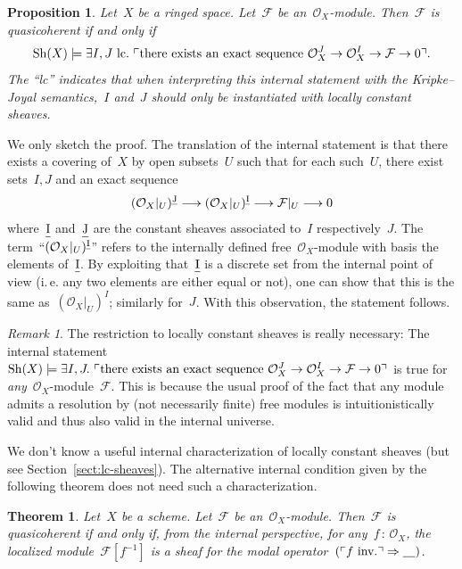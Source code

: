 \documentclass[10pt,reqno,a4paper]{amsbook}
\makeatletter
\theoremstyle{definition}
\theoremstyle{plain}
\newtheorem{prop}[defn]{Proposition}
\newtheorem{thm}[defn]{Theorem}
\theoremstyle{remark}
\newtheorem{rem}[defn]{Remark}
\newcommand{\F}{\mathcal{F}}
\renewcommand{\O}{\mathcal{O}}
\newcommand{\placeholder}{\underline{\quad}}
\let\oldul\ul
\renewcommand{\ul}[1]{\text{\oldul{$#1$}}}
\newcommand{\Sh}{\mathrm{Sh}}
\newcommand{\?}{\,{:}\,}
\renewcommand{\_}{\mathpunct{.}\,}
\newcommand{\speak}[1]{\ulcorner\text{\textnormal{#1}}\urcorner}
\newcommand{\ie}{i.\,e.\@\xspace}
\newcommand{\inv}{inv.\@}
\renewenvironment{proof}[1][\proofname]{\par
  \pushQED{\qed}%
  \normalfont \topsep6\p@\@plus6\p@\relax
  \trivlist
  \item[\hskip\labelsep
        \itshape
    #1\@addpunct{.}]\ignorespaces
}{%
  \popQED\endtrivlist\@endpefalse
}
\makeatother
\begin{document}
\begin{prop}Let~$X$ be a ringed space. Let~$\F$ be an~$\O_X$-module. Then~$\F$
is quasicoherent if and only if
\[ \Sh(X) \models \exists I,J\ \mathrm{lc}\_ \speak{there exists an
  exact sequence~$\O_X^J \to \O_X^I \to \F \to 0$}. \]
The ``\textnormal{lc}'' indicates that when interpreting this internal statement with the
Kripke--Joyal semantics,~$I$ and~$J$ should only be instantiated with
\emph{locally constant} sheaves.
\end{prop}
\begin{proof} We only sketch the proof.
The translation of the internal statement is that there exists a covering
of~$X$ by open subsets~$U$ such that for each such~$U$, there exist sets~$I,J$
and an exact sequence
\[ (\O_X|_U)^{\ul{J}} \longrightarrow (\O_X|_U)^{\ul{I}} \longrightarrow \F|_U
\longrightarrow 0 \]
where~$\ul{I}$ and~$\ul{J}$ are the constant sheaves associated to~$I$
respectively~$J$. The term~``$(\O_X|_U)^{\ul{I}}$'' refers to the internally
defined free~$\O_X$-module with basis the elements of~$\ul{I}$. By exploiting
that~$\ul{I}$ is a discrete set from the internal point of view (\ie any two
elements are either equal or not), one can show that this is the same
as~$(\O_X|_U)^I$; similarly for~$J$. With this observation, the statement
follows.
\end{proof}

\begin{rem}The restriction to locally constant sheaves is really necessary: The
internal statement~$\Sh(X) \models \exists I,J\_ \speak{there exists an
exact sequence~$\O_X^J \to \O_X^I \to \F \to 0$}$ is true for
\emph{any}~$\O_X$-module~$\F$. This is because the usual proof of the fact that
any module admits a resolution by (not necessarily finite) free modules is
intuitionistically valid and thus also valid in the internal
universe.\end{rem}

We don't know a useful internal characterization of
locally constant sheaves (but see Section~\ref{sect:lc-sheaves}). The
alternative internal condition given by the following
theorem does not need such a characterization.

\begin{thm}\label{thm:qcoh-sheafchar}
Let~$X$ be a scheme. Let~$\F$ be an~$\O_X$-module. Then~$\F$ is
quasicoherent if and only if, from the internal perspective, for any~$f\?\O_X$,
the localized module~$\F[f^{-1}]$ is a sheaf for the modal operator~$(\speak{$f$ \inv}
\Rightarrow \placeholder)$.
\end{thm}
\end{document}
